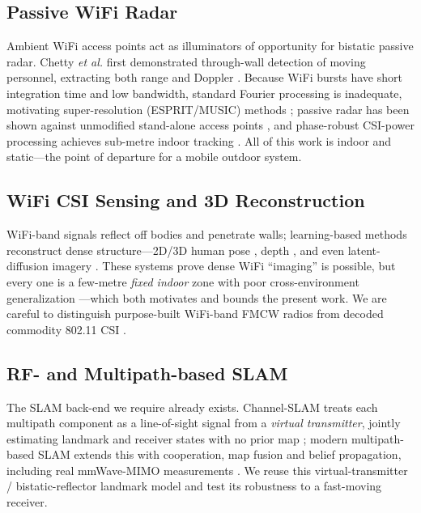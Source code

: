 \documentclass[journal]{IEEEtran}
\begin{document}
\subsection{Passive WiFi Radar}
Ambient WiFi access points act as illuminators of opportunity for bistatic passive
radar. Chetty \emph{et al.} first demonstrated through-wall detection of moving
personnel, extracting both range and Doppler \cite{chetty2012ttwifi}. Because WiFi
bursts have short integration time and low bandwidth, standard Fourier processing
is inadequate, motivating super-resolution (ESPRIT/MUSIC) methods
\cite{yildirim2021superres}; passive radar has been shown against unmodified
stand-alone access points \cite{li2021standalone}, and phase-robust CSI-power
processing achieves sub-metre indoor tracking \cite{wang2025csipower}. All of this
work is indoor and static---the point of departure for a mobile outdoor system.

\subsection{WiFi CSI Sensing and 3D Reconstruction}
WiFi-band signals reflect off bodies and penetrate walls; learning-based methods
reconstruct dense structure---2D/3D human pose
\cite{zhao2018rfpose,zhao2018rfpose3d,yan2024personinwifi3d,wang2019personinwifi},
depth \cite{widepth2025}, and even latent-diffusion imagery \cite{latentcsi2025}.
These systems prove dense WiFi ``imaging'' is possible, but every one is a
few-metre \emph{fixed indoor} zone with poor cross-environment generalization
\cite{yan2024personinwifi3d}---which both motivates and bounds the present work.
We are careful to distinguish purpose-built WiFi-band FMCW radios
\cite{zhao2018rfpose} from decoded commodity 802.11 CSI \cite{wang2019personinwifi}.

\subsection{RF- and Multipath-based SLAM}
The SLAM back-end we require already exists. Channel-SLAM treats each multipath
component as a line-of-sight signal from a \emph{virtual transmitter}, jointly
estimating landmark and receiver states with no prior map
\cite{gentner2016channelslam,ulmschneider2017multipath}; modern multipath-based
SLAM extends this with cooperation, map fusion and belief propagation, including
real mmWave-MIMO measurements
\cite{leitinger2024mpslamcoop,li2024bpmpslam}. We reuse this virtual-transmitter /
bistatic-reflector landmark model and test its robustness to a fast-moving receiver.
\end{document}
